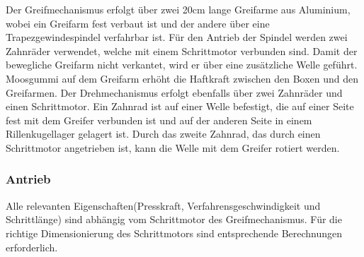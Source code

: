 Der Greifmechanismus erfolgt über zwei 20cm lange Greifarme aus Aluminium, wobei ein Greifarm fest verbaut ist und der andere über eine Trapezgewindespindel verfahrbar ist. Für den Antrieb der Spindel werden zwei Zahnräder verwendet, welche mit einem Schrittmotor verbunden sind. Damit der bewegliche Greifarm nicht verkantet, wird er über eine zusätzliche Welle geführt. Moosgummi auf dem Greifarm erhöht die Haftkraft zwischen den Boxen und den Greifarmen. Der Drehmechanismus erfolgt ebenfalls über zwei Zahnräder und einen Schrittmotor. Ein Zahnrad ist auf einer Welle befestigt, die auf einer Seite fest mit dem Greifer verbunden ist und auf der anderen Seite in einem Rillenkugellager gelagert ist. Durch das zweite Zahnrad, das durch einen Schrittmotor angetrieben ist, kann die Welle  mit dem Greifer rotiert werden. 


\subsubsection{Antrieb}

Alle relevanten Eigenschaften(Presskraft, Verfahrensgeschwindigkeit und Schrittlänge) sind abhängig vom Schrittmotor 
des Greifmechanismus. Für die richtige Dimensionierung des Schrittmotors sind entsprechende Berechnungen erforderlich.

